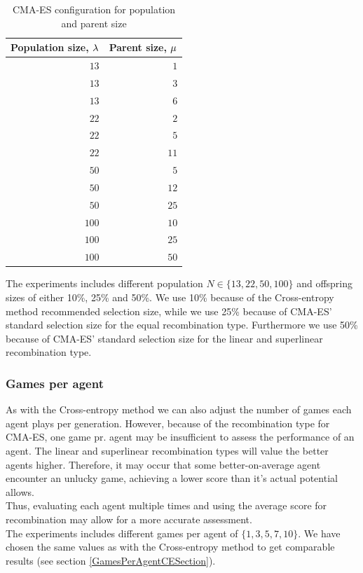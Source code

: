 \begin{table}[H]
\centering
\begin{tabular}{r r}
Population size, $\lambda$ & Parent size, $\mu$\\
\hline
$13$ & $1$\\
$13$ & $3$\\
$13$ & $6$\\
$22$ & $2$\\
$22$ & $5$\\
$22$ & $11$\\
$50$ & $5$\\
$50$ & $12$\\
$50$ & $25$\\
$100$ & $10$\\
$100$ & $25$\\
$100$ & $50$
\end{tabular}
\caption{CMA-ES configuration for population and parent size \label{CMAPopulationSelectionConfigTest}}
\end{table}

The experiments includes different population $N \in \{13,22,50,100\}$ and offspring sizes of either
10\%, 25\% and 50\%. We use 10\% because of the Cross-entropy method recommended selection size, while
we use 25\% because of CMA-ES' standard selection size for the equal recombination type. 
Furthermore we use 50\% because of CMA-ES' standard selection size for the linear and superlinear 
recombination type.

\subsubsection{Games per agent \label{CMAGamesPerAgentSection}}
As with the Cross-entropy method we can also adjust the number of games each agent plays per generation.
However, because of the recombination type for CMA-ES, one game pr. agent may  be insufficient to assess the
performance of an agent. The linear and superlinear recombination types will value the better agents higher.
Therefore, it may occur that some better-on-average agent encounter an unlucky game, achieving a lower score than
it's actual potential allows. \\
Thus, evaluating each agent multiple times and using the average score for recombination may allow for a more accurate assessment.\\

The experiments includes different games per agent of $\{1,3,5,7,10\}$. We have chosen the same 
values as with the Cross-entropy method to get comparable results (see section \ref{GamesPerAgentCESection}).

